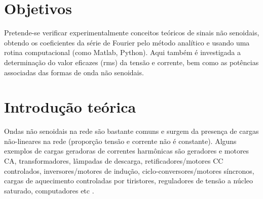 \documentclass[a4paper,12pt,oneside,openany,table,xcdraw]{article}
\begin{document}
\newcommand{\thedepartment}{Faculdade de Engenharia Elétrica}
\newcommand{\thecourse}{FEELT}
\newcommand{\thetitle}{ANÁLISE DE ONDAS NÃO SENOIDAIS - LÂMPADAS (CARGAS NÃO LINEARES)}
\newcommand{\thetype}{Relatório da Disciplina de Experimental de Circuitos Elétricos II}
\newcommand{\theproftitle}{Bacharel em Engenharia Elétrica}
\newcommand{\thestudent}{Lesly Viviane Montúfar Berrios\\
\centering11811ETE001}
\newcommand{\theadvisor}{Prof. Wellington Maycon Santos Bernardes}
\newcommand{\thecity}{Uberlândia}

\thispagestyle{empty}



\onehalfspacing
\tableofcontents %
\newpage

\section{Objetivos} %
Pretende-se verificar experimentalmente conceitos teóricos de sinais não senoidais, obtendo os coeficientes da série de Fourier pelo método analítico e usando uma rotina computacional (como Matlab, Python). Aqui também é investigada a determinação do valor eficazes (rms) da tensão e corrente, bem como as potências associadas das formas de onda não senoidais.

\section{Introdução teórica} %

Ondas não senoidais na rede são bastante comuns e surgem da presença de cargas não-lineares na rede (proporção tensão e corrente não é constante). Alguns exemplos de cargas geradoras de correntes harmônicas são geradores e motores CA, transformadores, lâmpadas de descarga, retificadores/motores CC controlados, inversores/motores de indução, ciclo-conversores/motores síncronos, cargas de aquecimento controladas por tiristores, reguladores de tensão a núcleo saturado, computadores etc \cite{PH}. 
\end{document}
